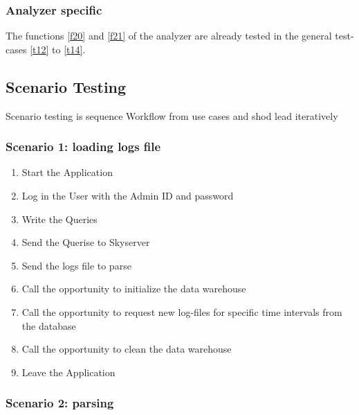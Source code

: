 \subsubsection{Analyzer specific}

The functions  \ref{f20} and \ref{f21} of the analyzer are 
already tested in the general test-cases \ref{t12} to \ref{t14}.



\subsection{Scenario Testing}

Scenario testing is sequence Workflow from use cases and shod lead iteratively

\renewcommand{\theenumi}{/T\arabic{enumi}0/}
\renewcommand{\labelenumi}{\theenumi}

\subsubsection {Scenario 1: loading logs file} 

\begin{enumerate}
 
\item Start the Application

\item Log in the User with the Admin ID and password

\item Write the Queries

\item Send the Querise to Skyserver

\item Send the logs file to parse

\item Call the opportunity to initialize the data warehouse

\item Call the opportunity to request new log-files for specific time intervals from the
database

\item Call the opportunity to clean the data warehouse %

\item Leave the Application

\end{enumerate} 

\subsubsection {Scenario 2: parsing} 

